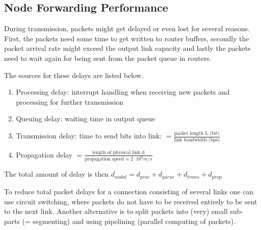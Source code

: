 \subsection{Node Forwarding Performance}
During transmission, packets might get delayed or even lost for several reasons.
First, the packets need some time to get written to router buffers, secondly the packet arrival rate might exceed the output link capacity and lastly the packets need to wait again for being sent from the packet queue in routers.

The sources for these delays are listed below.
\begin{enumerate}
  \item Processing delay: interrupt handling when receiving new packets and processing for further transmission
  \item Queuing delay: waiting time in output queue
  \item Transmission delay: time to send bits into link: $= \frac{\text{packet length L (bit)}}{\text{link bandwidth (bps)}}$
  \item Propagation delay $=\frac{\text{length of physical link d}}{\text{propagation speed} \approx 2 \cdot 10^8 m/s}$
\end{enumerate}
The total amount of delay is then $d_{nodal} = d_{proc} + d_{queue} + d_{trans} + d_{prop}$

To reduce total packet delays for a connection consisting of several links one can use circuit switching, where packets do not have to be received entirely to be sent to the next link.
Another alternative is to split packets into (very) small sub-parts (= segmenting) and using pipelining (parallel computing of packets).
